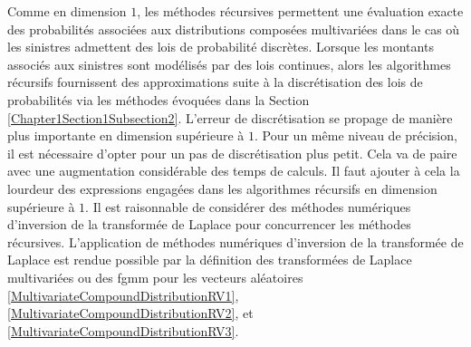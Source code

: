 Comme en dimension $1$, les méthodes récursives permettent une évaluation exacte des probabilités associées aux distributions composées multivariées dans le cas où les sinistres admettent des lois de probabilité discrètes. Lorsque les montants associés aux sinistres sont modélisés par des lois continues, alors les algorithmes récursifs fournissent des approximations suite à la discrétisation des lois de probabilités via les méthodes évoquées dans la Section \ref{Chapter1Section1Subsection2}. L'erreur de discrétisation se propage de manière plus importante en dimension supérieure à $1$. Pour un même niveau de précision, il est nécessaire d'opter pour un pas de discrétisation plus petit. Cela va de paire avec une augmentation considérable des temps de calculs. Il faut ajouter à cela la lourdeur des expressions engagées dans les algorithmes récursifs en dimension supérieure à $1$. Il est raisonnable de considérer des méthodes numériques d\rq{}inversion de la transformée de Laplace pour concurrencer les méthodes récursives. L\rq{}application de méthodes numériques d\rq{}inversion de la transformée de Laplace est rendue possible par la définition des transformées de Laplace multivariées ou des \gls{fgmm} pour les vecteurs aléatoires \eqref{MultivariateCompoundDistributionRV1}, \eqref{MultivariateCompoundDistributionRV2}, et \eqref{MultivariateCompoundDistributionRV3}. 

